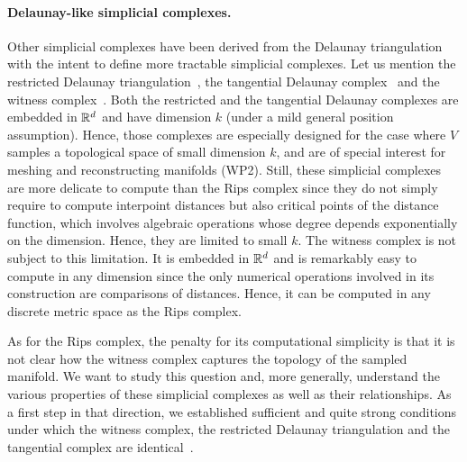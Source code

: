 \paragraph{Delaunay-like  simplicial complexes.} 
Other simplicial complexes have been derived from the Delaunay triangulation with the intent to
define more tractable simplicial complexes. Let us mention the restricted Delaunay triangulation~\cite{he-gtmg-2001}, the tangential Delaunay complex~\cite{geometrica-7142i} and the witness complex~\cite{cds-tewc-2004}. Both the restricted and the tangential Delaunay complexes are embedded in $\mathbb R^d$ and have dimension $k$ (under a mild general position assumption).  Hence, those complexes are especially designed for the case where $V$ samples a topological space of small dimension $k$, and are of special interest for meshing and reconstructing manifolds (WP2).  Still, these simplicial complexes are more delicate to compute 
than the Rips complex since they do not simply require to compute interpoint distances but also  critical points of the distance function, which involves algebraic operations whose degree depends exponentially on the dimension. Hence, they are  limited to small $k$.
The witness complex is not subject to this limitation. It is embedded in $\mathbb R ^d$ and is remarkably easy to compute in any dimension since the only numerical operations involved in its construction are comparisons of distances. Hence, it can be computed in any discrete metric space as the Rips complex. 

As for the Rips complex, the penalty for its computational simplicity is that it is not clear how the witness complex captures the topology of the sampled manifold. 
We want to study this question and, more generally, understand the various properties of these simplicial complexes as well as their relationships. As a  first step in that direction, we established sufficient and quite strong conditions under which the witness complex, the restricted Delaunay triangulation and the tangential complex are identical~\cite{boissonnat2012stab}. 

